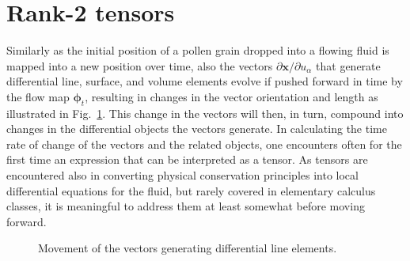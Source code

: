 \section{Rank-2 tensors}
Similarly as the initial position of a pollen grain dropped into a flowing fluid is mapped into a new position over time, also the vectors $\partial\bm{x}/\partial u_\alpha$ that generate differential line, surface, and volume elements evolve if pushed forward in time by the flow map $\bm{\phi}_t$, resulting in changes in the vector orientation and length as illustrated in Fig.~\ref{fig:differential-elements-movement}. This change in the vectors will then, in turn, compound into changes in the differential objects the vectors generate. In calculating the time rate of change of the vectors and the related objects, one encounters often for the first time an expression that can be interpreted as a tensor. As tensors are encountered also in converting physical conservation principles into local differential equations for the fluid, but rarely covered in elementary calculus classes, it is meaningful to address them at least somewhat before moving forward. 
\begin{figure}[!htb]
    \centering
    
    \caption{Movement of the vectors generating differential line elements.}
    \label{fig:differential-elements-movement}
\end{figure}

